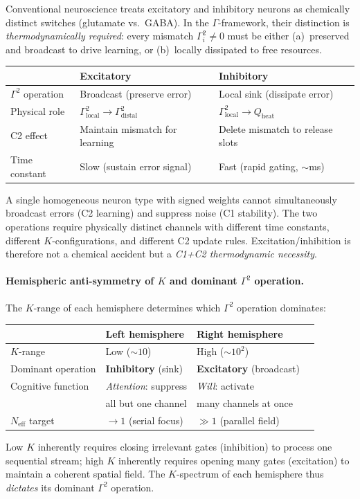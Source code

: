 \documentclass[aps,pre,twocolumn,superscriptaddress,floatfix]{revtex4-2}
\begin{document}
\begin{remark}
\label{rem:excitatory-inhibitory}
Conventional neuroscience treats excitatory and
inhibitory neurons as chemically distinct switches
(glutamate vs.\ GABA).  In the $\Gamma$-framework,
their distinction is \emph{thermodynamically
required}: every mismatch $\Gamma_i^2 \neq 0$
must be either (a)~preserved and broadcast to drive
learning, or (b)~locally dissipated to free
resources.
\begin{center}
\begin{tabular}{@{}lll@{}}
\toprule
& Excitatory & Inhibitory \\
\midrule
$\Gamma^2$ operation &
  Broadcast (preserve error) &
  Local sink (dissipate error) \\
Physical role &
  $\Gamma^2_{\text{local}} \to
  \Gamma^2_{\text{distal}}$ &
  $\Gamma^2_{\text{local}} \to
  Q_{\text{heat}}$ \\
C2 effect &
  Maintain mismatch for learning &
  Delete mismatch to release slots \\
Time constant &
  Slow (sustain error signal) &
  Fast (rapid gating, $\sim$ms) \\
\bottomrule
\end{tabular}
\end{center}
A single homogeneous neuron type with signed
weights cannot simultaneously broadcast errors
(C2 learning) and suppress noise (C1 stability).
The two operations require physically distinct
channels with different time constants, different
$K$-configurations, and different C2 update rules.
Excitation/inhibition is therefore not a chemical
accident but a \emph{C1+C2 thermodynamic necessity}.

\paragraph{Hemispheric anti-symmetry of $K$ and
dominant $\Gamma^2$ operation.}
The $K$-range of each hemisphere determines
which $\Gamma^2$ operation dominates:
\begin{center}
\begin{tabular}{@{}llll@{}}
\toprule
& Left hemisphere & Right hemisphere \\
\midrule
$K$-range &
  Low ($\sim\!10$) &
  High ($\sim\!10^2$) \\
Dominant operation &
  \textbf{Inhibitory} (sink) &
  \textbf{Excitatory} (broadcast) \\
Cognitive function &
  \emph{Attention}: suppress &
  \emph{Will}: activate \\
& all but one channel &
  many channels at once \\
$N_{\text{eff}}$ target &
  $\to 1$ (serial focus) &
  $\gg 1$ (parallel field) \\
\bottomrule
\end{tabular}
\end{center}
Low $K$ inherently requires closing irrelevant gates
(inhibition) to process one sequential stream;
high $K$ inherently requires opening many gates
(excitation) to maintain a coherent spatial field.
The $K$-spectrum of each hemisphere thus
\emph{dictates} its dominant $\Gamma^2$ operation.


\end{remark}
\end{document}
